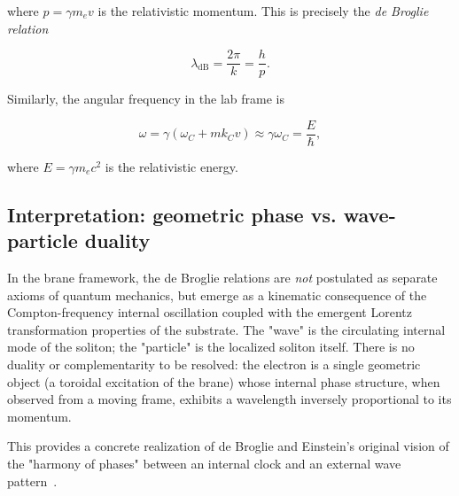where $p = \gamma m_e v$ is the relativistic momentum. This is precisely the
\emph{de Broglie relation}

\begin{equation}
\lambda_{\text{dB}} = \frac{2\pi}{k} = \frac{h}{p}.
\label{eq:de-broglie-wavelength}
\end{equation}

Similarly, the angular frequency in the lab frame is

\begin{equation}
\omega = \gamma (\omega_C + m k_C v) \approx \gamma \omega_C = \frac{E}{\hbar},
\end{equation}

where $E = \gamma m_e c^2$ is the relativistic energy.

\subsection{Interpretation: geometric phase vs. wave-particle duality}

In the brane framework, the de Broglie relations are \emph{not} postulated as
separate axioms of quantum mechanics, but emerge as a kinematic consequence of
the Compton-frequency internal oscillation coupled with the emergent Lorentz
transformation properties of the substrate. The "wave" is the circulating
internal mode of the soliton; the "particle" is the localized soliton itself.
There is no duality or complementarity to be resolved: the electron is a single
geometric object (a toroidal excitation of the brane) whose internal phase
structure, when observed from a moving frame, exhibits a wavelength inversely
proportional to its momentum.

This provides a concrete realization of de Broglie and Einstein's original
vision of the "harmony of phases" between an internal clock and an external wave
pattern~\cite{deBroglie1923,deBroglie1924}.